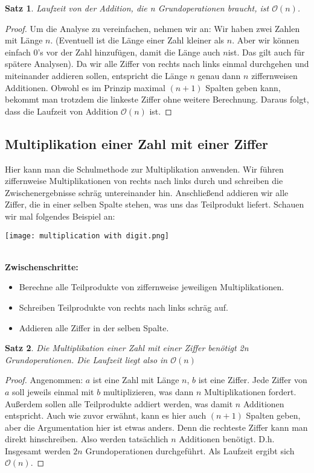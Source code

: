 \documentclass[11pt,a4paper, twoside]{article}
\newtheorem{theorem}{Satz}
\theoremstyle{definition}
\begin{document}
\begin{theorem}
Laufzeit von der Addition, die n Grundoperationen braucht, ist $\mathcal{O}(n)$.
\end{theorem}
\begin{proof}
Um die Analyse zu vereinfachen, nehmen wir an: Wir haben zwei Zahlen mit Länge \(n\). (Eventuell ist die Länge einer Zahl kleiner als \(n\). Aber wir können einfach 0’s vor der Zahl hinzufügen, damit die Länge auch \(n\)ist. Das gilt auch für spätere Analysen). 
Da wir alle Ziffer von rechts nach links einmal durchgehen und miteinander addieren sollen, entspricht die Länge \(n\) genau dann \(n\) ziffernweisen Additionen. Obwohl es im Prinzip maximal $(n + 1)$ Spalten geben kann, bekommt man trotzdem die linkeste Ziffer ohne weitere Berechnung. Daraus folgt, dass die Laufzeit von Addition $\mathcal{O}(n)$ ist.
\end{proof}


\subsection{Multiplikation einer Zahl mit einer Ziffer}
Hier kann man die Schulmethode zur Multiplikation anwenden. Wir führen ziffernweise Multiplikationen von rechts nach links durch und schreiben die Zwischenergebnisse schräg untereinander hin. Anschließend addieren wir alle Ziffer, die in einer selben Spalte stehen, was uns das Teilprodukt liefert. Schauen wir mal folgendes Beispiel an:\\
\centerline{\texttt{[image: multiplication with digit.png]}}\\
\textbf{Zwischenschritte:} \\
\begin{itemize}
\item Berechne alle Teilprodukte von ziffernweise jeweiligen Multiplikationen. \\
\item Schreiben Teilprodukte von rechts nach links schräg auf.\\
\item Addieren alle Ziffer in der selben Spalte. 
\end{itemize}

\begin{theorem}
Die Multiplikation einer Zahl mit einer Ziffer benötigt 2n Grundoperationen. Die Laufzeit liegt also in $\mathcal{O}(n)$
\end{theorem}
\begin{proof}
Angenommen: $a$ ist eine Zahl mit Länge $n$, $b$ ist eine Ziffer. Jede Ziffer von $a$ soll jeweils einmal mit $b$ multiplizieren, was dann \(n\) Multiplikationen fordert. Außerdem sollen alle Teilprodukte addiert werden, was damit \(n\) Additionen entspricht. Auch wie zuvor erwähnt, kann es hier auch $(n + 1)$ Spalten geben, aber die Argumentation hier ist etwas anders. Denn die rechteste Ziffer kann man direkt hinschreiben. Also werden tatsächlich \(n\) Additionen benötigt.  D.h. Insgesamt werden $2n$ Grundoperationen durchgeführt. Als Laufzeit ergibt sich $\mathcal{O}(n)$.
\end{proof}
\end{document}
